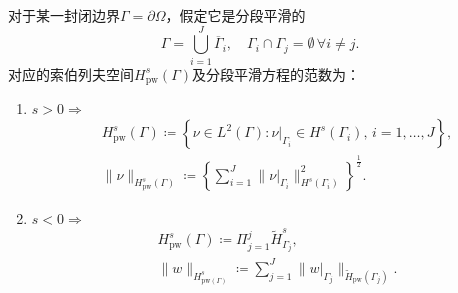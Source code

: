 \begin{lemma}[分段平滑索伯列夫空间]
  对于某一封闭边界$\Gamma = \partial \Omega$，假定它是分段平滑的
  \begin{equation*}
    \Gamma = \bigcup_{i=1}^{J} \overline{\Gamma}_i, \quad \Gamma_i \cap \Gamma_j = \emptyset \,  \forall i \neq j.
  \end{equation*}
  对应的索伯列夫空间$H^s_{\text{pw}}(\Gamma)$及分段平滑方程的范数为：

  \begin{enumerate}
    \item $s>0 \Rightarrow$
    \begin{equation*}
      \begin{split}
        & H^{s}_{\text{pw}}(\Gamma) \coloneqq \left\{ \nu \in L^{2}(\Gamma) : \nu |_{\Gamma_i} \in H^{s}(\Gamma_i), \, i=1,\ldots,J \right\}, \\
        & \big\| \nu \big\|_{H^{s}_{\text{pw}}(\Gamma)} \coloneqq
        \left\{
        \sum_{i=1}^{J} \big\| \nu|_{\Gamma_i} \big\|_{H^s(\Gamma_i)}^2
        \right\}^{\frac{1}{2}}.
      \end{split}
    \end{equation*}

    \item $s < 0 \Rightarrow$
    \begin{align}
      \label{eq:sobolev-piecewise-snegative-def}
      &H^{s}_{\text{pw}}(\Gamma) \coloneqq \Pi_{j=1}^{j} \widetilde{H}^{s}_{\Gamma_j}, \\
      \label{eq:sobolev-piecewise-snegative-norm}
      & \big\| w \big\|_{H^{s}_{\text{pw}(\Gamma)}} \coloneqq
      \sum_{j=1}^{J} \big\| w|_{\Gamma_j} \big\|_{\widetilde{H}_{\text{pw}}(\Gamma_j)}.
    \end{align}
  \end{enumerate}
\end{lemma}

